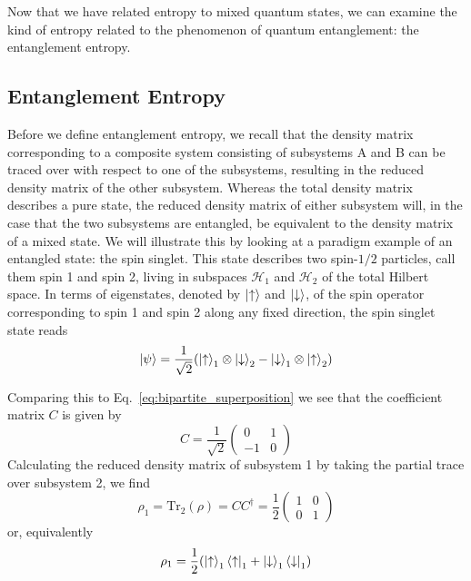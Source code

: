 \documentclass[12pt,oneside,openright]{report}
\theoremstyle{definition}
\theoremstyle{plain}
\theoremstyle{remark}
\begin{document}
Now that we have related entropy to mixed quantum states, we can examine the kind of entropy related to the phenomenon 
of quantum entanglement: the entanglement entropy.

\subsection{Entanglement Entropy}
Before we define entanglement entropy, we recall that the density matrix corresponding to a
composite system consisting of subsystems A and B can be traced over with respect to one of
the subsystems, resulting in the reduced density matrix of the other subsystem. Whereas the
total density matrix describes a pure state, the reduced density matrix of either subsystem will,
in the case that the two subsystems are entangled, be equivalent to the density matrix of a mixed
state.
We will illustrate this by looking at a paradigm example of an entangled state: the spin singlet.
This state describes two spin-$1/2$ particles, call them spin 1 and spin 2, living in subspaces 
$\mathcal{H}_1$ and $\mathcal{H}_2$ of the total Hilbert space.
In terms of eigenstates, denoted by $\ket{\uparrow}$ and $\ket{\downarrow}$, of the spin operator 
corresponding to spin 1 and spin 2 along any fixed direction, the spin singlet state reads
\begin{equation}
\ket{\psi} = \frac{1}{\sqrt{2}} (\ket{\uparrow}_1 \otimes \ket{\downarrow}_2 - \ket{\downarrow}_1 \otimes \ket{\uparrow}_2)
\end{equation}

Comparing this to Eq.~\eqref{eq:bipartite_superposition} we see that the coefficient matrix $C$ is given by
\begin{equation}
C = \frac{1}{\sqrt{2}} \begin{pmatrix} 0 & 1 \\ -1 & 0 \end{pmatrix}
\end{equation}
Calculating the reduced density matrix of subsystem 1 by taking the partial trace over subsystem 2, we find
\begin{equation}
\rho_1 = \mathrm{Tr}_2(\rho) = CC^{\dagger} = \frac{1}{2} \begin{pmatrix} 1 & 0 \\ 0 & 1 \end{pmatrix}
\end{equation}
or, equivalently
\begin{equation}
\rho_1 = \frac{1}{2} (\ket{\uparrow}_1 \bra{\uparrow}_1 + \ket{\downarrow}_1 \bra{\downarrow}_1)
\end{equation}
\end{document}
